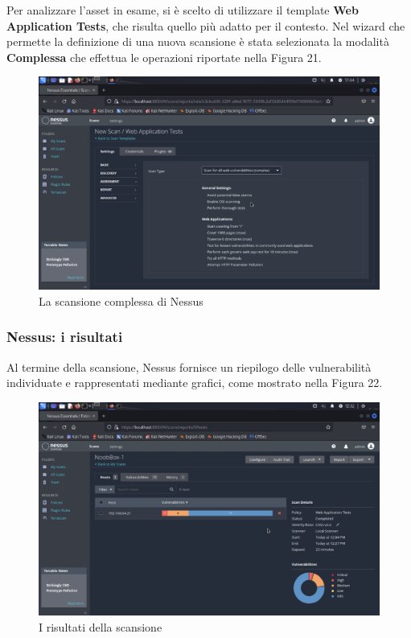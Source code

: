 \documentclass[a4paper, 12pt, oneside]{article}
\begin{document}
Per analizzare l'asset in esame, si è scelto di utilizzare il template \textbf{Web Application Tests}, che risulta quello più adatto per il contesto. Nel wizard che permette la definizione di una nuova scansione è stata selezionata la modalità \textbf{Complessa} che effettua le operazioni riportate nella Figura 21.

\begin{figure}[h!]
    \centering
    \includegraphics[width=\textwidth]{img/nessus-complex-scan.png}
    \caption{La scansione complessa di Nessus}
\end{figure}

\newpage
\subsubsection{Nessus: i risultati}
Al termine della scansione, Nessus fornisce un riepilogo delle vulnerabilità individuate e rappresentati mediante grafici, come mostrato nella Figura 22.

\begin{figure}[h!]
    \centering
    \includegraphics[width=\textwidth]{img/nessus-results.png}
    \caption{I risultati della scansione}
\end{figure}
\end{document}
